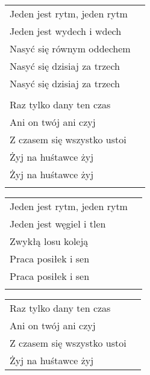 \documentclass[a5paper]{article}
\begin{document}
\noindent
\begin{tabular}{@{}p{6.50cm}p{3cm}@{}}
	Jeden jest rytm, jeden rytm \\	 
	Jeden jest wydech i wdech	 \\
	Nasyć się równym oddechem	 \\
	Nasyć się dzisiaj za trzech	 \\
	Nasyć się dzisiaj za trzech	 \\ \\

	Raz tylko dany ten czas	 \\
	Ani on twój ani czyj	 \\
	Z czasem się wszystko ustoi	 \\ 
	Żyj na huśtawce żyj	 \\
	Żyj na huśtawce żyj	 \\ \\
\end{tabular}

\noindent
\begin{tabular}{@{}p{6.50cm}p{3cm}@{}}
		Jeden jest rytm, jeden rytm	 \\
		Jeden jest węgiel i tlen	 \\
		Zwykłą losu koleją	 \\
		Praca posiłek i sen	 \\
		Praca posiłek i sen	 \\ \\
\end{tabular}

\noindent
\begin{tabular}{@{}p{6.50cm}p{3cm}@{}}
	Raz tylko dany ten czas	 \\
	Ani on twój ani czyj	 \\
	Z czasem się wszystko ustoi\\	 
	Żyj na huśtawce żyj
\end{tabular}
\end{document}
